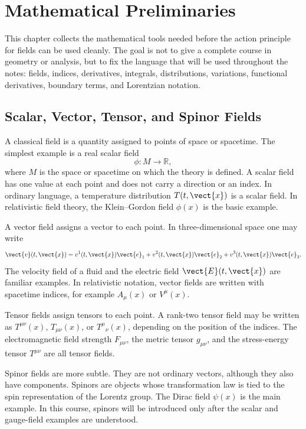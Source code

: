 \chapter{Mathematical Preliminaries}

\begin{remarkbox}
This chapter collects the mathematical tools needed before the action principle
for fields can be used cleanly. The goal is not to give a complete course in
geometry or analysis, but to fix the language that will be used throughout the
notes: fields, indices, derivatives, integrals, distributions, variations,
functional derivatives, boundary terms, and Lorentzian notation.
\end{remarkbox}

\section{Scalar, Vector, Tensor, and Spinor Fields}

A classical field is a quantity assigned to points of space or spacetime. The
simplest example is a real scalar field
\[
    \phi : M \to \mathbb{R},
\]
where \(M\) is the space or spacetime on which the theory is defined. A scalar
field has one value at each point and does not carry a direction or an index.
In ordinary language, a temperature distribution \(T(t,\vect{x})\) is a scalar
field. In relativistic field theory, the Klein--Gordon field \(\phi(x)\) is the
basic example.

A vector field assigns a vector to each point. In three-dimensional space one
may write
\[
    \vect{v}(t,\vect{x}) = v^1(t,\vect{x})\vect{e}_1
    + v^2(t,\vect{x})\vect{e}_2
    + v^3(t,\vect{x})\vect{e}_3.
\]
The velocity field of a fluid and the electric field \(\vect{E}(t,\vect{x})\)
are familiar examples. In relativistic notation, vector fields are written with
spacetime indices, for example \(A_\mu(x)\) or \(V^\mu(x)\).

Tensor fields assign tensors to each point. A rank-two tensor field may be
written as \(T^{\mu\nu}(x)\), \(T_{\mu\nu}(x)\), or \(T^\mu{}_{\nu}(x)\),
depending on the position of the indices. The electromagnetic field strength
\(F_{\mu\nu}\), the metric tensor \(g_{\mu\nu}\), and the stress-energy tensor
\(T^{\mu\nu}\) are all tensor fields.

Spinor fields are more subtle. They are not ordinary vectors, although they
also have components. Spinors are objects whose transformation law is tied to
the spin representation of the Lorentz group. The Dirac field \(\psi(x)\) is the
main example. In this course, spinors will be introduced only after the scalar
and gauge-field examples are understood.

